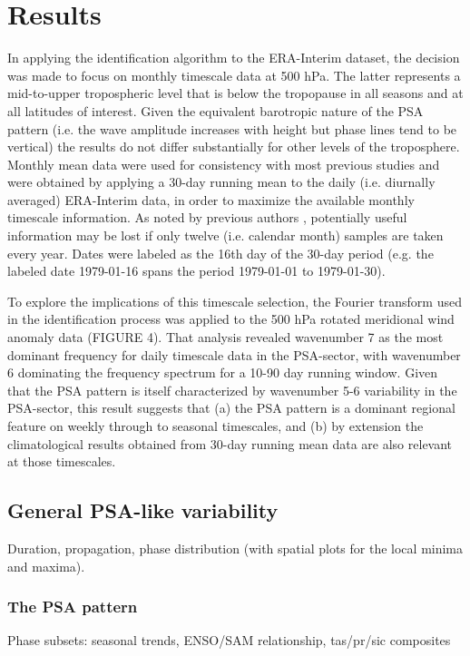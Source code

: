 \section{Results}

In applying the identification algorithm to the ERA-Interim dataset, the decision was made to focus on monthly timescale data at 500 hPa. The latter represents a mid-to-upper tropospheric level that is below the tropopause in all seasons and at all latitudes of interest. Given the equivalent barotropic nature of the PSA pattern (i.e. the wave amplitude increases with height but phase lines tend to be vertical) the results do not differ substantially for other levels of the troposphere. Monthly mean data were used for consistency with most previous studies and were obtained by applying a 30-day running mean to the daily (i.e. diurnally averaged) ERA-Interim data, in order to maximize the available monthly timescale information. As noted by previous authors \citep[e.g.][]{Kidson1988}, potentially useful information may be lost if only twelve (i.e. calendar month) samples are taken every year. Dates were labeled as the 16th day of the 30-day period (e.g. the labeled date 1979-01-16 spans the period 1979-01-01 to 1979-01-30).

To explore the implications of this timescale selection, the Fourier transform used in the identification process was applied to the 500 hPa rotated meridional wind anomaly data (FIGURE 4). That analysis revealed wavenumber 7 as the most dominant frequency for daily timescale data in the PSA-sector, with wavenumber 6 dominating the frequency spectrum for a 10-90 day running window. Given that the PSA pattern is itself characterized by wavenumber 5-6 variability in the PSA-sector, this result suggests that (a) the PSA pattern is a dominant regional feature on weekly through to seasonal timescales, and (b) by extension the climatological results obtained from 30-day running mean data are also relevant at those timescales.

\subsection{General PSA-like variability}

Duration, propagation, phase distribution (with spatial plots for the local minima and maxima).

\subsubsection{The PSA pattern}

Phase subsets: seasonal trends, ENSO/SAM relationship, tas/pr/sic composites







